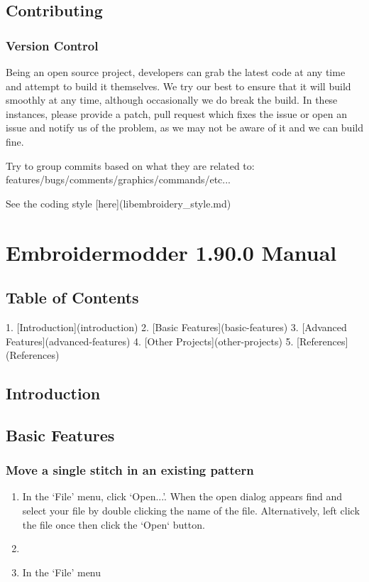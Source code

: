 \documentclass[a4paper, 11pt]{report}
\begin{document}
\section{Contributing}

\subsection{Version Control}

Being an open source project, developers can grab the latest code at any time
and attempt to build it themselves. We try our best to ensure that it will build smoothly
at any time, although occasionally we do break the build. In these instances,
please provide a patch, pull request which fixes the issue or open an issue and
notify us of the problem, as we may not be aware of it and we can build fine.

Try to group commits based on what they are related to: features/bugs/comments/graphics/commands/etc...

See the coding style [here](libembroidery\_style.md)

\chapter{Embroidermodder 1.90.0 Manual}

\section{Table of Contents}

  1. [Introduction](introduction)
  2. [Basic Features](basic-features)
  3. [Advanced Features](advanced-features)
  4. [Other Projects](other-projects)
  5. [References](References)

\section{Introduction}

\section{Basic Features}

\subsection{Move a single stitch in an existing pattern}

\begin{enumerate}
\item In the `File' menu, click `Open...'. When the open dialog appears find
  and select your file by double clicking the name of the file. Alternatively,
  left click the file once then click the `Open` button.
\item
\item In the `File' menu
\end{enumerate}
\end{document}
